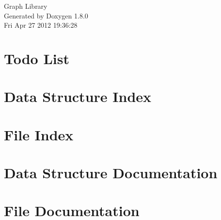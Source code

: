 \documentclass{book}
\begin{document}
\hypersetup{pageanchor=false,citecolor=blue}
\begin{titlepage}
\vspace*{7cm}
\begin{center}
{\Large Graph Library }\\
\vspace*{1cm}
{\large Generated by Doxygen 1.8.0}\\
\vspace*{0.5cm}
{\small Fri Apr 27 2012 19:36:28}\\
\end{center}
\end{titlepage}
\clearemptydoublepage
{}
\tableofcontents
\clearemptydoublepage
{}
\hypersetup{pageanchor=true,citecolor=blue}
\chapter{Todo List}
\label{todo}
\hypertarget{todo}{}

\chapter{Data Structure Index}

\chapter{File Index}

\chapter{Data Structure Documentation}







\chapter{File Documentation}





















\printindex
\end{document}
